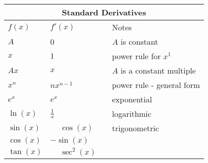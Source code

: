 \begin{center}
	\renewcommand{\arraystretch}{1.2}
		\begin{tabular}{llll}
			\multicolumn{4}{c}{Standard Derivatives}\\\midrule
			$f(x)$ & $f'(x)$  &&Notes\\ \midrule
			$A$&0&&$A$ is constant\\ 
			$x$&$1$&&power rule for $x^1$\\ 
			$Ax$&$x$&&$A$ is a constant multiple\\ \midrule
			$x^n$ & $nx^{n-1}$ &&power rule - general form\\ 
			$e^x$ & $e^x$  && exponential\\ 
			$\ln(x)$ & $\frac{1}{x}$ &&logarithmic\\ \midrule
			$\sin(x)$ & $\phantom{-}\cos(x)$  &&trigonometric \\ 
			$\cos(x)$ & $-\sin(x)$ && \\ 
			$\tan(x)$ & $\phantom{-}\sec^2(x)$ && \\ \bottomrule
		\end{tabular}
	\end{center}
